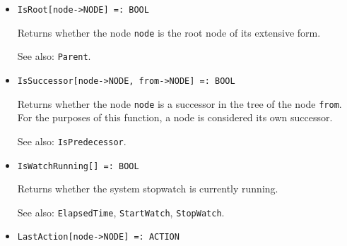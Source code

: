 \begin{itemize}
\item
\protect \large \begin{verbatim}
IsRoot[node->NODE] =: BOOL
\end{verbatim}\normalsize

\bd
Returns whether the node \verb+node+ is the root node of its
extensive form.
\item
[See also:] {\tt Parent}.
\ed

\item
\protect \large \begin{verbatim}
IsSuccessor[node->NODE, from->NODE] =: BOOL
\end{verbatim}\normalsize

\bd
Returns whether the node \verb+node+ is a successor
in the tree of the node \verb+from+.  For the purposes of this function,
a node is considered its own successor.
\item
[See also:] {\tt IsPredecessor}.
\ed

\item
\protect \large \begin{verbatim}
IsWatchRunning[] =: BOOL
\end{verbatim}\normalsize

\bd
Returns whether the system stopwatch is currently running.
\item
[See also:] {\tt ElapsedTime}, {\tt StartWatch}, {\tt StopWatch}.
\ed


%



\item
\protect \large \begin{verbatim} 
LastAction[node->NODE] =: ACTION
\end{verbatim}\normalsize


\end{itemize}
